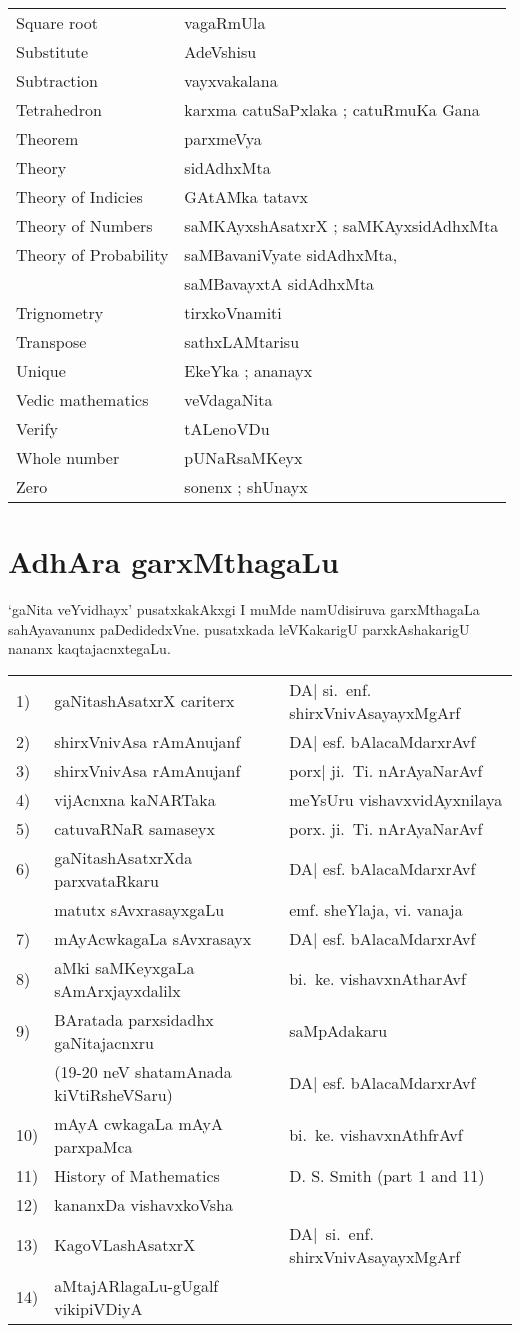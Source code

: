 {\begin{longtable}{>{\rm}l@{\hspace{1cm}}l}
Square root & vagaRmUla\\
Substitute & AdeVshisu\\
Subtraction & vayxvakalana\\
Tetrahedron & karxma catuSaPxlaka ; catuRmuKa Gana\\
Theorem & parxmeVya\\
Theory & sidAdhxMta\\
Theory of Indicies & GAtAMka tatavx\\
Theory of Numbers & saMKAyxshAsatxrX ; saMKAyxsidAdhxMta\\
Theory of Probability & saMBavaniVyate sidAdhxMta,\\[-0.1cm] 
 &saMBavayxtA sidAdhxMta\\
Trignometry & tirxkoVnamiti\\
Transpose & sathxLAMtarisu\\
Unique & EkeYka ; ananayx\\
Vedic mathematics & veVdagaNita\\
Verify & tALenoVDu\\
Whole number & pUNaRsaMKeyx\\
Zero & sonenx ; shUnayx
\end{longtable}

\newpage
\section*{AdhAra garxMthagaLu}

`gaNita veYvidhayx' pusatxkakAkxgi I muMde namUdisiruva garxMthagaLa sahAyavanunx paDedidedxVne. pusatxkada leVKakarigU parxkAshakarigU nananx kaqtajacnxtegaLu.

\begin{longtable}{l>{\raggedright}p{4cm}>{\raggedright}p{4cm}}
{\rm 1)} &  gaNitashAsatxrX cariterx & DA| si.~enf. shirxVnivAsayayxMgArf \tabularnewline
{\rm 2)} & shirxVnivAsa rAmAnujanf & DA| esf. bAlacaMdarxrAvf\tabularnewline
{\rm 3)} & shirxVnivAsa rAmAnujanf & porx| ji.~Ti. nArAyaNarAvf\tabularnewline
{\rm 4)} & vijAcnxna kaNARTaka & meYsUru vishavxvidAyxnilaya\tabularnewline
{\rm 5)} & catuvaRNaR samaseyx & porx. ji.~Ti. nArAyaNarAvf\tabularnewline
{\rm 6)} & gaNitashAsatxrXda parxvataRkaru & DA| esf. bAlacaMdarxrAvf\tabularnewline[-0.1cm]
& matutx sAvxrasayxgaLu & emf. sheYlaja, vi. vanaja\tabularnewline
{\rm 7)} & mAyAcwkagaLa sAvxrasayx & DA| esf. bAlacaMdarxrAvf\tabularnewline
{\rm 8)} & aMki saMKeyxgaLa sAmArxjayxdalilx & bi.~ke. vishavxnAtharAvf\tabularnewline
{\rm 9)} & BAratada parxsidadhx gaNitajacnxru  & saMpAdakaru \tabularnewline[-0.1cm]
& ({\rm 19-20} neV shatamAnada kiVtiRsheVSaru) & DA| esf. bAlacaMdarxrAvf\tabularnewline
{\rm 10)} & mAyA cwkagaLa mAyA parxpaMca & bi.~ke. vishavxnAthfrAvf\tabularnewline
{\rm 11)} & {\rm History of Mathematics} & {\rm D. S. Smith (part 1 and 11)}\tabularnewline[-0.1cm]
{\rm 12)} & kananxDa vishavxkoVsha &\tabularnewline
{\rm 13)} & KagoVLashAsatxrX & DA|~si.~enf. shirxVnivAsayayxMgArf\tabularnewline
{\rm 14)} & aMtajARlagaLu-gUgalf vikipiVDiyA &\tabularnewline
\end{longtable}

}
